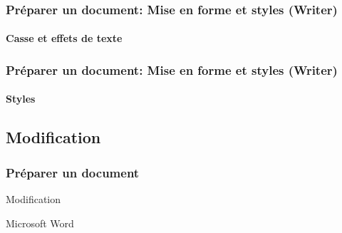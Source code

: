\documentclass[xcolor=table]{beamer}
\begin{document}
\begin{frame}
\frametitle{Préparer un document: Mise en forme et styles (Writer)}
\framesubtitle{Casse et effets de texte}

\begin{minipage}{0.58\textwidth}
\end{minipage}
\begin{minipage}{0.4\textwidth}
%
\end{minipage}

\end{frame}


\begin{frame}
\frametitle{Préparer un document: Mise en forme et styles (Writer)}
\framesubtitle{Styles}

\begin{minipage}{0.58\textwidth}
\end{minipage}
\begin{minipage}{0.4\textwidth}
%
%
\end{minipage}

\end{frame}

\subsection{Modification}%

\begin{frame}
\frametitle{Préparer un document}

\begin{center}
	Modification 
	
	Microsoft Word
\end{center}

\end{frame}
\end{document}
